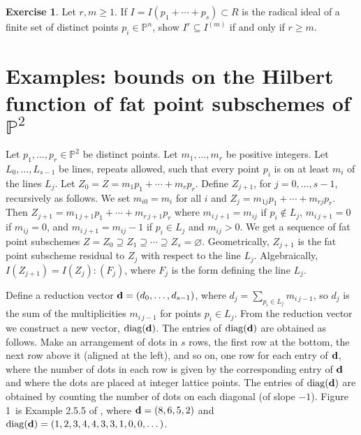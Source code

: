 \documentclass[11pt,twoside]{amsart}
\numberwithin{equation}{section}
\newcounter{xrcs}[section]
\theoremstyle{definition}
\newtheorem{exercise}[xrcs]{Exercise}
\begin{document}
\begin{exercise}\label{easyContainment}
Let $r,m\geq 1$. If $I=I(p_1+\cdots+p_s)\subset R$ is the radical ideal of a finite set of 
distinct points $p_i\in{\mathbb{P}^{n}}$, show $I^r\subseteq I^{(m)}$ if and only if $r\geq m$.
\end{exercise}

\section{Examples: bounds on the Hilbert function of fat point subschemes of ${\mathbb{P}^{2}}$}

Let $p_1,\ldots,p_r\in{\mathbb{P}^{2}}$ be distinct points. Let $m_1,\ldots,m_r$ be positive integers.
Let $L_0,\ldots,L_{s-1}$ be lines, repeats allowed,
such that every point $p_i$ is on at least $m_i$ of the lines $L_j$.
Let $Z_0=Z=m_1p_1+\cdots+m_rp_r$. 
Define $Z_{j+1}$, for $j=0,\ldots,s-1$, recursively as follows. 
We set $m_{i0}=m_i$ for all $i$ and $Z_j=m_{1j}p_1+\cdots+m_{rj}p_r$.
Then $Z_{j+1}=m_{1\,j+1}p_1+\cdots+m_{r\,j+1}p_r$
where $m_{i\, j+1}=m_{ij}$ if $p_i\not\in L_j$,
$m_{i\, j+1}=0$ if $m_{ij}=0$, and
$m_{i\, j+1}=m_{ij}-1$ if $p_i\in L_j$ and $m_{ij}>0$.
We get a sequence of fat point subschemes 
$Z=Z_0\supseteq Z_1 \supseteq \cdots \supseteq Z_s=\varnothing$.
Geometrically, $Z_{j+1}$ is the fat point subscheme residual  
to $Z_j$ with respect to the line $L_j$. Algebraically,
$I(Z_{j+1})=I(Z_j):(F_j)$, where $F_j$ is the form defining
the line $L_j$.

Define a reduction vector ${\bf d}=(d_0,\ldots,d_{s-1})$, where 
$d_j=\sum_{p_i\in L_j}m_{i\,j-1}$, so $d_j$
is the sum of the multiplicities $m_{i\,j-1}$ for points $p_i\in L_j$.
From the reduction vector we construct a new vector,
$\operatorname{diag}({\bf d})$. The entries of $\operatorname{diag}({\bf d})$
are obtained as follows. Make an arrangement of dots in $s$ rows,
the first row at the bottom, the next row above it (aligned at the left), and so on,
one row for each entry of ${\bf d}$, where the number of dots in each row is 
given by the corresponding entry of ${\bf d}$ and where the dots are placed at integer lattice points.
The entries of $\operatorname{diag}({\bf d})$ are obtained by counting the number of dots
on each diagonal (of slope $-1$).
Figure {1}\ is Example 2.5.5 of \cite{refCHT}, where ${\bf d}=(8,6,5,2)$ and 
$\operatorname{diag}({\bf d}) = (1, 2, 3, 4, 4, 3, 3, 1, 0, 0, \dots)$.
\end{document}
